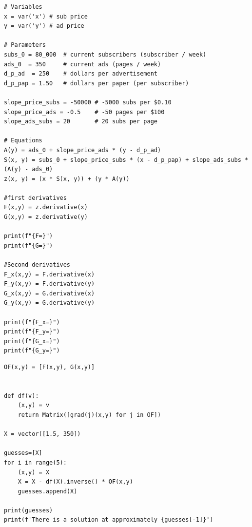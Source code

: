 \documentclass[12pt, oneside]{book}
\begin{document}
    

\newpage

\label{ex:4}
\begin{verbatim}
# Variables
x = var('x') # sub price
y = var('y') # ad price

# Parameters
subs_0 = 80_000  # current subscribers (subscriber / week)
ads_0  = 350     # current ads (pages / week)
d_p_ad  = 250    # dollars per advertisement
d_p_pap = 1.50   # dollars per paper (per subscriber)

slope_price_subs = -50000 # -5000 subs per $0.10
slope_price_ads = -0.5    # -50 pages per $100
slope_ads_subs = 20       # 20 subs per page

# Equations
A(y) = ads_0 + slope_price_ads * (y - d_p_ad)
S(x, y) = subs_0 + slope_price_subs * (x - d_p_pap) + slope_ads_subs * (A(y) - ads_0)
z(x, y) = (x * S(x, y)) + (y * A(y))

#first derivatives
F(x,y) = z.derivative(x)
G(x,y) = z.derivative(y)

print(f"{F=}")
print(f"{G=}")

#Second derivatives
F_x(x,y) = F.derivative(x)
F_y(x,y) = F.derivative(y)
G_x(x,y) = G.derivative(x)
G_y(x,y) = G.derivative(y)

print(f"{F_x=}")
print(f"{F_y=}")
print(f"{G_x=}")
print(f"{G_y=}")
\end{verbatim}


    \newpage

\label{ex:5}
\begin{verbatim}
OF(x,y) = [F(x,y), G(x,y)]


def df(v):
    (x,y) = v
    return Matrix([grad(j)(x,y) for j in OF])

X = vector([1.5, 350])

guesses=[X]
for i in range(5):
    (x,y) = X
    X = X - df(X).inverse() * OF(x,y)
    guesses.append(X)
    
print(guesses)
print(f'There is a solution at approximately {guesses[-1]}')
\end{verbatim}
\end{document}
